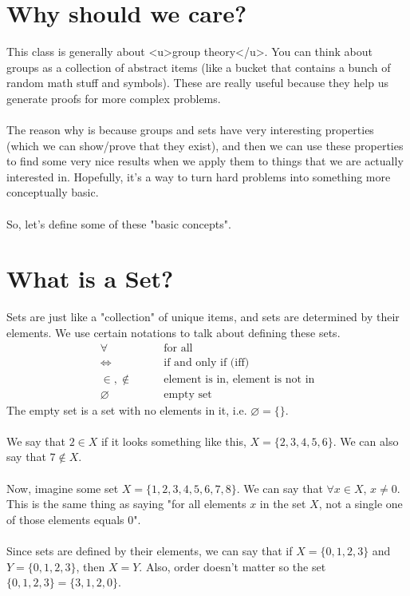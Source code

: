 \section{Why should we care?}

This class is generally about <u>group theory</u>. You can think about groups as a collection of abstract items (like a bucket that contains a bunch of random math stuff and symbols). These are really useful because they help us generate proofs for more complex problems.\\
\\
The reason why is because groups and sets have very interesting properties (which we can show/prove that they exist), and then we can use these properties to find some very nice results when we apply them to things that we are actually interested in. Hopefully, it's a way to turn hard problems into something more conceptually basic.\\
\\
So, let's define some of these "basic concepts".

\section{What is a Set?}

Sets are just like a "collection" of unique items, and sets are determined by their elements. We use certain notations to talk about defining these sets.
\begin{align*}
\forall \quad \quad &\text{for all} \\
\iff \quad \quad &\text{if and only if (iff)}\\
\in, \notin \quad \quad &\text{element is in, element is not in}\\
\varnothing \quad \quad &\text{empty set}
\end{align*}
The empty set is a set with no elements in it, i.e. $\varnothing = \{\}$. \\
\\
We say that $2 \in X$ if it looks something like this, $X = \{2,3,4,5,6\}$. We can also say that $7 \notin X$. \\
\\
Now, imagine some set $X = \{1,2,3,4,5,6,7,8\}$. We can say that $\forall x \in X$, $x \neq 0$. This is the same thing as saying "for all elements $x$ in the set $X$, not a single one of those elements equals $0$". \\
\\
Since sets are defined by their elements, we can say that if $X = \{0,1,2,3\}$ and $Y = \{0,1,2,3\}$, then $X = Y$. Also, order doesn't matter so the set $\{0,1,2,3\} = \{3,1,2,0\}$. 


